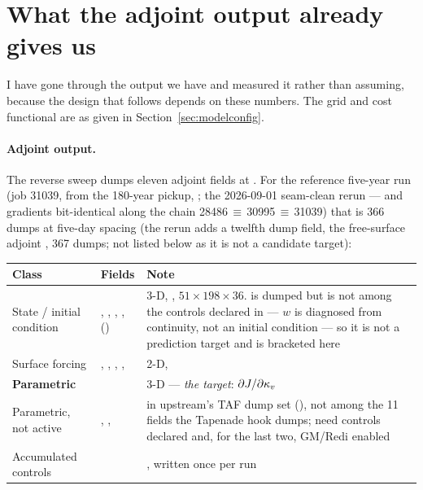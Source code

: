 \section{What the adjoint output already gives us}
\label{sec:adjoutput}

I have gone through the output we have and measured it rather than assuming,
because the design that follows depends on these numbers. The grid and cost
functional are as given in Section~\ref{sec:modelconfig}.

\paragraph{Adjoint output.}
The reverse sweep dumps eleven adjoint fields at . For the
reference five-year run (job 31039, from the 180-year pickup, ;
the 2026-09-01 seam-clean rerun ---  and gradients bit-identical
along the chain 28486\,$\equiv$\,30995\,$\equiv$\,31039) that is $366$
dumps at five-day spacing (the rerun adds a twelfth dump field, the
free-surface adjoint , 367 dumps; not listed below as it is
not a candidate target):

\begin{center}
\begin{tabularx}{\textwidth}{@{}Y{0.7}Y{1.1}Y{1.2}@{}}
\toprule
\textbf{Class} & \textbf{Fields} & \textbf{Note}\\
\midrule
State / initial condition & , ,
  , , ()
  & 3-D, , $51\times198\times36$.  is dumped but
     is not among the controls declared in  ---
    $w$ is diagnosed from continuity, not an initial condition --- so it is not
    a prediction target and is bracketed here\\
Surface forcing & , , ,
  , 
  & 2-D, \\
\textbf{Parametric} & 
  & 3-D --- \emph{the target}: $\partial J/\partial\kappa_{v}$\\
Parametric, not active & , , 
  & in upstream's TAF dump set (), not among the
    11 fields the Tapenade hook dumps; need controls declared and, for the last
    two, GM/Redi enabled\\
\midrule
Accumulated controls &  & , written once per run\\
\bottomrule
\end{tabularx}
\end{center}

